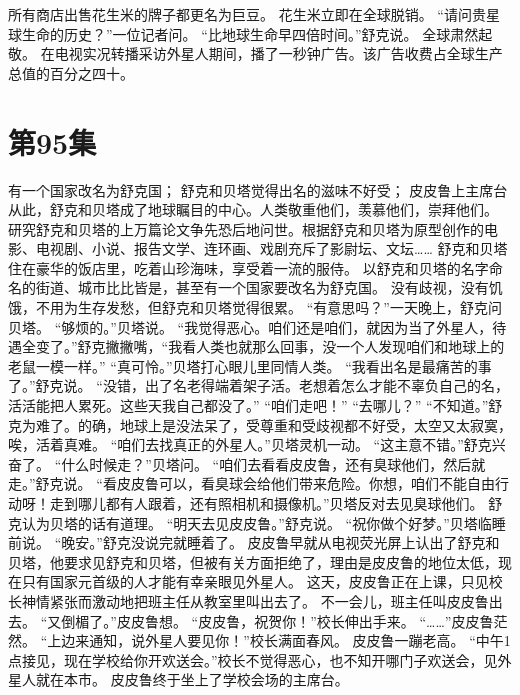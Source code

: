 \documentclass[a4paper,12pt,UTF8,twoside]{ctexbook}
\begin{document}
        所有商店出售花生米的牌子都更名为巨豆。 
        花生米立即在全球脱销。 
        “请问贵星球生命的历史？”一位记者问。 
        “比地球生命早四倍时间。”舒克说。 
        全球肃然起敬。 
        在电视实况转播采访外星人期间，播了一秒钟广告。该广告收费占全球生产总值的百分之四十。   \chapter{第95集} 
        有一个国家改名为舒克国； 
        舒克和贝塔觉得出名的滋味不好受； 
        皮皮鲁上主席台   
        从此，舒克和贝塔成了地球瞩目的中心。人类敬重他们，羡慕他们，崇拜他们。 
        研究舒克和贝塔的上万篇论文争先恐后地问世。根据舒克和贝塔为原型创作的电影、电视剧、小说、报告文学、连环画、戏剧充斥了影尉坛、文坛…… 
        舒克和贝塔住在豪华的饭店里，吃着山珍海味，享受着一流的服侍。 
        以舒克和贝塔的名字命名的街道、城市比比皆是，甚至有一个国家要改名为舒克国。 
        没有歧视，没有饥饿，不用为生存发愁，但舒克和贝塔觉得很累。 
        “有意思吗？”一天晚上，舒克问贝塔。 
        “够烦的。”贝塔说。 
        “我觉得恶心。咱们还是咱们，就因为当了外星人，待遇全变了。”舒克撇撇嘴，“我看人类也就那么回事，没一个人发现咱们和地球上的老鼠一模一样。” 
        “真可怜。”贝塔打心眼儿里同情人类。 
        “我看出名是最痛苦的事了。”舒克说。 
        “没错，出了名老得端着架子活。老想着怎么才能不辜负自己的名，活活能把人累死。这些天我自己都没了。” 
        “咱们走吧！” 
        “去哪儿？” 
        “不知道。”舒克为难了。的确，地球上是没法呆了，受尊重和受歧视都不好受，太空又太寂寞，唉，活着真难。 
        “咱们去找真正的外星人。”贝塔灵机一动。 
        “这主意不错。”舒克兴奋了。 
        “什么时候走？”贝塔问。 
        “咱们去看看皮皮鲁，还有臭球他们，然后就走。”舒克说。 
        “看皮皮鲁可以，看臭球会给他们带来危险。你想，咱们不能自由行动呀！走到哪儿都有人跟着，还有照相机和摄像机。”贝塔反对去见臭球他们。 
        舒克认为贝塔的话有道理。 
        “明天去见皮皮鲁。”舒克说。 
        “祝你做个好梦。”贝塔临睡前说。 
        “晚安。”舒克没说完就睡着了。 
        皮皮鲁早就从电视荧光屏上认出了舒克和贝塔，他要求见舒克和贝塔，但被有关方面拒绝了，理由是皮皮鲁的地位太低，现在只有国家元首级的人才能有幸亲眼见外星人。 
        这天，皮皮鲁正在上课，只见校长神情紧张而激动地把班主任从教室里叫出去了。 
        不一会儿，班主任叫皮皮鲁出去。 
        “又倒楣了。”皮皮鲁想。 
        “皮皮鲁，祝贺你！”校长伸出手来。 
        “……”皮皮鲁茫然。 
        “上边来通知，说外星人要见你！”校长满面春风。 
        皮皮鲁一蹦老高。 
        “中午1点接见，现在学校给你开欢送会。”校长不觉得恶心，也不知开哪门子欢送会，见外星人就在本市。 
        皮皮鲁终于坐上了学校会场的主席台。 
\end{document}
